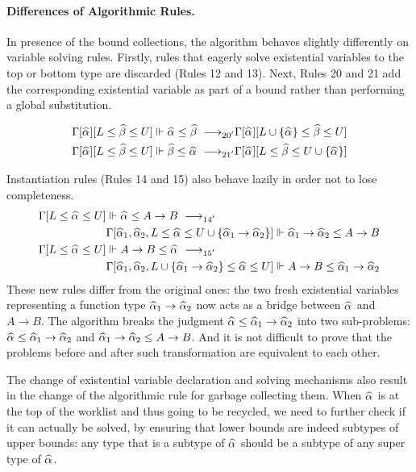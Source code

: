 \paragraph{Differences of Algorithmic Rules.}

In presence of the bound collections, the algorithm behaves slightly differently
on variable solving rules.
Firstly, rules that eagerly solve existential variables to the top or bottom type
are discarded (Rules 12 and 13).
Next, Rules 20 and 21 add the corresponding existential variable
as part of a bound rather than performing a global substitution.

\begin{gather*}
    \begin{aligned}
\Gm[\al][L \le \bt \le U] \Vdash \al \le \bt &\rrule{20'}
    \Gm[\al][L \cup \{\al\} \le \bt \le U]\\
\Gm[\al][L \le \bt \le U] \Vdash \bt \le \al &\rrule{21'}
    \Gm[\al][L \le \bt \le U \cup \{\al\}]\\
    \end{aligned}
\end{gather*}

Instantiation rules (Rules 14 and 15) also behave lazily in order not to lose completeness.
\begin{gather*}
    \begin{aligned}
\Gm[L \le \al \le U] &\Vdash \al \le A \to B \rrule{14'}\\
    & \Gm[\al[1], \al[2], L \le \al \le U \cup \{\al[1] \to \al[2]\}] \Vdash \al[1] \to \al[2] \le A \to B\\
\Gm[L \le \al \le U] &\Vdash A \to B \le \al \rrule{15'}\\
    & \Gm[\al[1], \al[2], L \cup \{\al[1] \to \al[2]\} \le \al \le U] \Vdash A \to B \le \al[1] \to \al[2]\\
    \end{aligned}
\end{gather*}
These new rules differ from the original ones:
the two fresh existential variables representing a function type $\al[1] \to \al[2]$
now acts as a bridge between $\al$ and $A \to B$.
The algorithm breaks the judgment $\al \le \al[1] \to \al[2]$ into two sub-problems:
$\al \le \al[1] \to \al[2]$ and $\al[1] \to \al[2] \le A \to B$.
And it is not difficult to prove that the problems before and after
such transformation are equivalent to each other.

The change of existential variable declaration and solving mechanisms
also result in the change of
the algorithmic rule for garbage collecting them.
When $\al$ is at the top of the worklist and thus going to be recycled,
we need to further check if it can actually be solved,
by ensuring that lower bounds are indeed subtypes of upper bounds:
any type that is a subtype of $\al$ should be a subtype of
any super type of $\al$.

